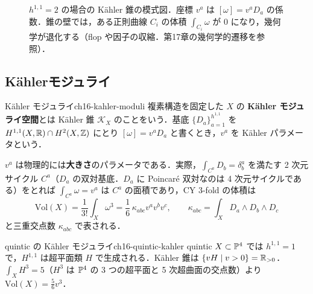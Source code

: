 \begin{figure}[H]
\centering
{}
\caption{$h^{1,1}=2$ の場合の K\"ahler 錐の模式図．座標 $v^a$ は $[\omega]=v^aD_a$ の係数．錐の壁では，ある正則曲線 $C_i$ の体積 $\int_{C_i}\omega$ が $0$ になり，幾何学が退化する（flop や因子の収縮．第17章の幾何学的遷移を参照）．}
\label{fig:ch16-kahler-cone}
\end{figure}

\subsection{K\"ahlerモジュライ}

\begin{mydef}{K\"ahler モジュライ}{ch16-kahler-moduli}
複素構造を固定した $X$ の \textbf{K\"ahler モジュライ空間}とは K\"ahler 錐 $\mathcal{K}_X$ のことをいう．基底 $\{D_a\}_{a=1}^{h^{1,1}}$ を $H^{1,1}(X,\mathbb{R})\cap H^2(X,\mathbb{Z})$ にとり $[\omega]=v^aD_a$ と書くとき，$v^a$ を K\"ahler パラメータという．
\end{mydef}

$v^a$ は物理的には\textbf{大きさ}のパラメータである．実際，$\int_{C^a}D_b=\delta^a_b$ を満たす 2 次元サイクル $C^a$（$D_a$ の双対基底．$D_a$ に Poincar\'e 双対なのは 4 次元サイクルである）をとれば $\int_{C^a}\omega=v^a$ は $C^a$ の面積であり，CY 3-fold の体積は
\begin{equation}
\mathrm{Vol}(X)=\frac{1}{3!}\int_X\omega^3=\frac16\,\kappa_{abc}v^av^bv^c,\qquad \kappa_{abc}=\int_XD_a\wedge D_b\wedge D_c
\label{eq:ch16-volume}
\end{equation}
と三重交点数 $\kappa_{abc}$ で表される．

\begin{myex}{quintic の K\"ahler モジュライ}{ch16-quintic-kahler}
quintic $X\subset\mathbb{P}^4$ では $h^{1,1}=1$ で，$H^{1,1}$ は超平面類 $H$ で生成される．K\"ahler 錐は $\{vH\mid v>0\}=\mathbb{R}_{>0}$．$\int_X H^3=5$（$H^3$ は $\mathbb{P}^4$ の 3 つの超平面と 5 次超曲面の交点数）より $\mathrm{Vol}(X)=\tfrac56v^3$．
\end{myex}

